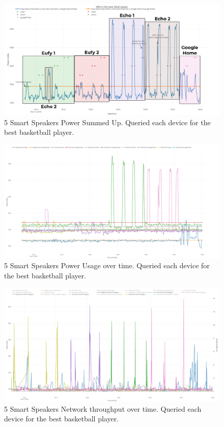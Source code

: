 \begin{figure}[H]
  \centering
  \includegraphics[width=1\textwidth]{figures/bestBballSum.png}
  \caption{5 Smart Speakers Power Summed Up. Queried each device for the
  best basketball player.}
  \label{fig:bestBballSum}
\end{figure}

\begin{figure}[H]
  \centering
  \includegraphics[width=1\textwidth]{figures/bestBballSeperate.png}
  \caption{5 Smart Speakers Power Usage over time. Queried each device for the
  best basketball player.}
  \label{fig:bestBballSeperate}
\end{figure}

\begin{figure}[H]
  \centering
  \includegraphics[width=1\textwidth]{figures/bestBballNetwork.png}
  \caption{5 Smart Speakers Network throughput over time. Queried each device for the best basketball player.}
  \label{fig:bestBballNetwork}
\end{figure}

